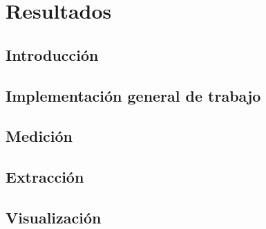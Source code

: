 \chapter{Resultados}
\section{Introducción}
\section{Implementación general de trabajo}
\section{Medición}
\section{Extracción}
\section{Visualización}